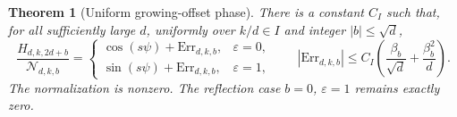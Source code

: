 \documentclass[11pt,a4paper]{article}
\numberwithin{equation}{section}
\newtheorem{theorem}{Theorem}[section]
\begin{document}
\begin{theorem}[Uniform growing-offset phase]\label{aud:go:uniform}
There is a constant $C_I$ such that, for all sufficiently large $d$, uniformly over $k/d\in I$ and integer $|b|\le\sqrt d$,
\begin{equation}\label{aud:go:uniformphase}
 \frac{H_{d,k,2d+b}}{\mathcal N_{d,k,b}}
 =\begin{cases}\cos(s\psi)+\mathrm{Err}_{d,k,b},&\varepsilon=0,\\
 \sin(s\psi)+\mathrm{Err}_{d,k,b},&\varepsilon=1,
 \end{cases}
 \qquad
 |\mathrm{Err}_{d,k,b}|\le C_I\left(\frac{\beta_b}{\sqrt d}+\frac{\beta_b^2}{d}\right).
\end{equation}
The normalization is nonzero. The reflection case $b=0$, $\varepsilon=1$ remains exactly zero.
\end{theorem}
\end{document}
